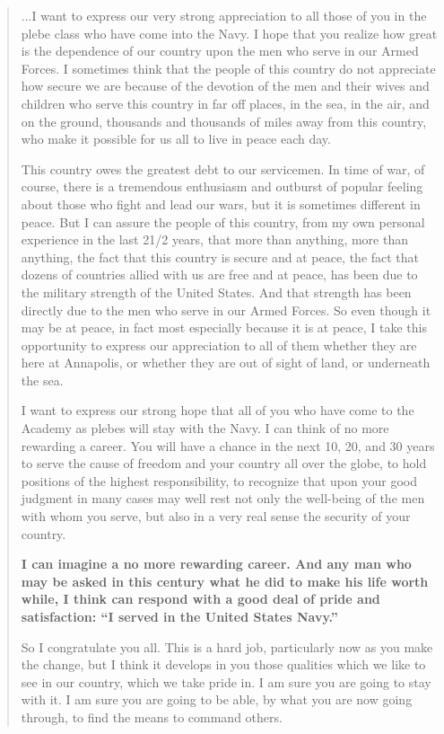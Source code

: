\documentclass[11pt,letter]{book}
\begin{document}
\begin{quotation}
...I want to express our very strong appreciation to all those of you in the plebe class who have come into the Navy. I hope that you realize how great is the dependence of our country upon the men who serve in our Armed Forces. I sometimes think that the people of this country do not appreciate how secure we are because of the devotion of the men and their wives and children who serve this country in far off places, in the sea, in the air, and on the ground, thousands and thousands of miles away from this country, who make it possible for us all to live in peace each day.

This country owes the greatest debt to our servicemen. In time of war, of course, there is a tremendous enthusiasm and outburst of popular feeling about those who fight and lead our wars, but it is sometimes different in peace. But I can assure the people of this country, from my own personal experience in the last 21/2 years, that more than anything, more than anything, the fact that this country is secure and at peace, the fact that dozens of countries allied with us are free and at peace, has been due to the military strength of the United States. And that strength has been directly due to the men who serve in our Armed Forces. So even though it may be at peace, in fact most especially because it is at peace, I take this opportunity to express our appreciation to all of them whether they are here at Annapolis, or whether they are out of sight of land, or underneath the sea.

I want to express our strong hope that all of you who have come to the Academy as plebes will stay with the Navy. I can think of no more rewarding a career. You will have a chance in the next 10, 20, and 30 years to serve the cause of freedom and your country all over the globe, to hold positions of the highest responsibility, to recognize that upon your good judgment in many cases may well rest not only the well-being of the men with whom you serve, but also in a very real sense the security of your country.

\textbf{I can imagine a no more rewarding career. And any man who may be asked in this century what he did to make his life worth while, I think can respond with a good deal of pride and satisfaction: ``I served in the United States Navy.''} 

So I congratulate you all. This is a hard job, particularly now as you make the change, but I think it develops in you those qualities which we like to see in our country, which we take pride in. I am sure you are going to stay with it. I am sure you are going to be able, by what you are now going through, to find the means to command others.


\end{quotation}
\end{document}
